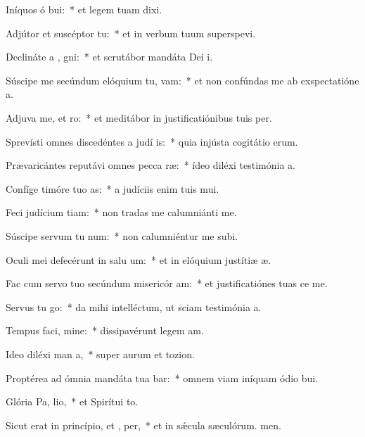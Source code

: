 \item Iníquos ó bui:~* et legem tuam dixi.
\item Adjútor et suscéptor   tu:~* et in verbum tuum superspevi.
\item Declináte a , gni:~* et scrutábor mandáta Dei i.
\item Súscipe me secúndum elóquium tu,  vam:~* et non confúndas me ab exspectatióne a.
\item Adjuva me, et  ro:~* et meditábor in justificatiónibus tuis per.
\item Sprevísti omnes discedéntes a judí is:~* quia injústa cogitátio erum.
\item Prævaricántes reputávi omnes pecca ræ:~* ídeo diléxi testimónia a.
\item Confíge timóre tuo  as:~* a judíciis enim tuis mui.
\item Feci judícium  tiam:~* non tradas me calumniánti me.
\item Súscipe servum tu  num:~* non calumniéntur me subi.
\item Oculi mei defecérunt in salu um:~* et in elóquium justítiæ æ.
\item Fac cum servo tuo secúndum misericór am:~* et justificatiónes tuas ce me.
\item Servus tu  go:~* da mihi intelléctum, ut sciam testimónia a.
\item Tempus faci, mine:~* dissipavérunt legem am.
\item Ideo diléxi man a,~* super aurum et tozion.
\item Proptérea ad ómnia mandáta tua bar:~* omnem viam iníquam ódio bui.
\item Glória Pa,  lio,~* et Spirítui to.
\item Sicut erat in princípio, et ,  per,~* et in sǽcula sæculórum. men.
